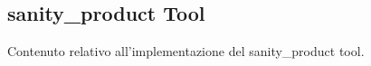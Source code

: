 \subsection{sanity\_product Tool}

Contenuto relativo all'implementazione del sanity\_product tool.
